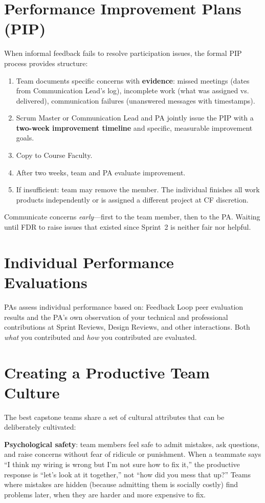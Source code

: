 \section{Performance Improvement Plans (PIP)}
When informal feedback fails to resolve participation issues, the formal PIP process provides structure:
\begin{enumerate}[nosep,leftmargin=1.5em]
\item Team documents specific concerns with \textbf{evidence}: missed meetings (dates from Communication Lead's log), incomplete work (what was assigned vs. delivered), communication failures (unanswered messages with timestamps).
\item Scrum Master or Communication Lead and PA jointly issue the PIP with a \textbf{two-week improvement timeline} and specific, measurable improvement goals.
\item Copy to Course Faculty.
\item After two weeks, team and PA evaluate improvement.
\item If insufficient: team may remove the member. The individual finishes all work products independently or is assigned a different project at CF discretion.
\end{enumerate}
Communicate concerns \emph{early}---first to the team member, then to the PA. Waiting until FDR to raise issues that existed since Sprint~2 is neither fair nor helpful.

\section{Individual Performance Evaluations}
PAs assess individual performance based on: Feedback Loop peer evaluation results and the PA's own observation of your technical and professional contributions at Sprint Reviews, Design Reviews, and other interactions. Both \emph{what} you contributed and \emph{how} you contributed are evaluated.

\section{Creating a Productive Team Culture}
The best capstone teams share a set of cultural attributes that can be deliberately cultivated:

\textbf{Psychological safety}: team members feel safe to admit mistakes, ask questions, and raise concerns without fear of ridicule or punishment. When a teammate says ``I think my wiring is wrong but I'm not sure how to fix it,'' the productive response is ``let's look at it together,'' not ``how did you mess that up?'' Teams where mistakes are hidden (because admitting them is socially costly) find problems later, when they are harder and more expensive to fix.

